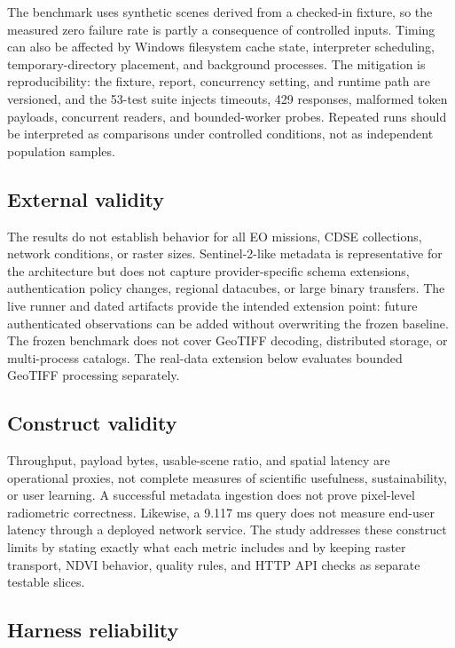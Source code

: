The benchmark uses synthetic scenes derived from a checked-in fixture, so the measured zero
failure rate is partly a consequence of controlled inputs. Timing can also be affected by Windows
filesystem cache state, interpreter scheduling, temporary-directory placement, and background
processes. The mitigation is reproducibility: the fixture, report, concurrency setting, and
runtime path are versioned, and the 53-test suite injects timeouts, 429 responses, malformed token
payloads, concurrent readers, and bounded-worker probes. Repeated runs should be interpreted as
comparisons under controlled conditions, not as independent population samples.

\subsection{External validity}

The results do not establish behavior for all EO missions, CDSE collections, network conditions,
or raster sizes. Sentinel-2-like metadata is representative for the architecture but does not
capture provider-specific schema extensions, authentication policy changes, regional datacubes, or
large binary transfers. The live runner and dated artifacts provide the intended extension point:
future authenticated observations can be added without overwriting the frozen baseline.
The frozen benchmark does not cover GeoTIFF decoding, distributed storage, or multi-process
catalogs. The real-data extension below evaluates bounded GeoTIFF processing separately.

\subsection{Construct validity}

Throughput, payload bytes, usable-scene ratio, and spatial latency are operational proxies, not
complete measures of scientific usefulness, sustainability, or user learning. A successful
metadata ingestion does not prove pixel-level radiometric correctness. Likewise, a 9.117 ms query
does not measure end-user latency through a deployed network service. The study addresses these
construct limits by stating exactly what each metric includes and by keeping raster transport,
NDVI behavior, quality rules, and HTTP API checks as separate testable slices.

\subsection{Harness reliability}

